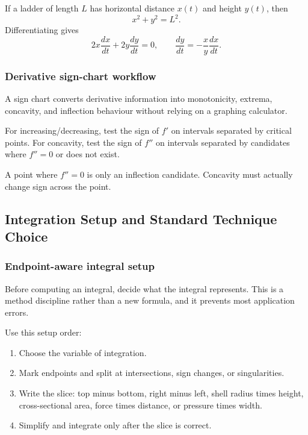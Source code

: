 \begin{examplebox}[title={Ladder Equation}]
If a ladder of length \(L\) has horizontal distance \(x(t)\) and height \(y(t)\),
then
\[
x^2+y^2=L^2.
\]
Differentiating gives
\[
2x\frac{dx}{dt}+2y\frac{dy}{dt}=0,
\qquad
\frac{dy}{dt}=-\frac{x}{y}\frac{dx}{dt}.
\]
\end{examplebox}

\newpage
\subsubsection{Derivative sign-chart workflow}
\begin{extension}
A sign chart converts derivative information into monotonicity, extrema,
concavity, and inflection behaviour without relying on a graphing calculator.
\end{extension}

\begin{examtip}
For increasing/decreasing, test the sign of \(f'\) on intervals separated by
critical points.  For concavity, test the sign of \(f''\) on intervals separated
by candidates where \(f''=0\) or does not exist.
\end{examtip}

\begin{commonmistake}
A point where \(f''=0\) is only an inflection candidate.  Concavity must actually
change sign across the point.
\end{commonmistake}

\newpage
\subsection{Integration Setup and Standard Technique Choice}

\subsubsection{Endpoint-aware integral setup}
\begin{extension}
Before computing an integral, decide what the integral represents.  This is a
method discipline rather than a new formula, and it prevents most application
errors.
\end{extension}

\begin{examtip}
Use this setup order:
\begin{enumerate}[leftmargin=*]
\item Choose the variable of integration.
\item Mark endpoints and split at intersections, sign changes, or singularities.
\item Write the slice: top minus bottom, right minus left, shell radius times
height, cross-sectional area, force times distance, or pressure times width.
\item Simplify and integrate only after the slice is correct.
\end{enumerate}
\end{examtip}


